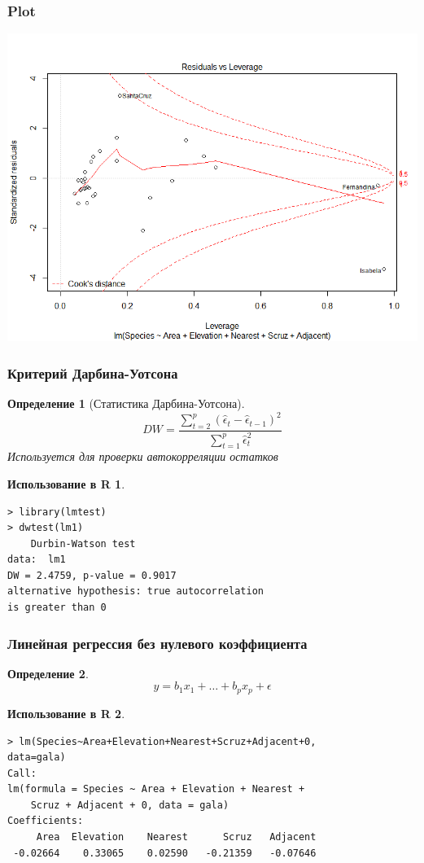 \documentclass{beamer}
\newtheorem{defn}{Определение}
\newtheorem{exmpr}{Использование в R}
\begin{document}
\begin{frame}
\frametitle{Plot}
\begin{center}
\includegraphics[width=1\textwidth,height=0.8\textheight]{lmplot4.png}
\end{center}
\end{frame}

\begin{frame}[containsverbatim]
\frametitle{Критерий Дарбина-Уотсона}
\begin{defn}[Статистика Дарбина-Уотсона]
$$DW=\dfrac{\sum\limits_{t=2}^p(\hat{\epsilon}_t-\hat{\epsilon}_{t-1})^2}{\sum\limits^p_{t=1}\hat{\epsilon}_t^2}$$
Используется для проверки автокорреляции остатков
\end{defn}
\begin{exmpr}
\begin{verbatim}
> library(lmtest)
> dwtest(lm1)
	Durbin-Watson test
data:  lm1 
DW = 2.4759, p-value = 0.9017
alternative hypothesis: true autocorrelation 
is greater than 0 
\end{verbatim}
\end{exmpr}
\end{frame}

\begin{frame}[containsverbatim]
\frametitle{Линейная регрессия без нулевого коэффициента}
\begin{defn}
$$y = b_1x_1+\ldots+b_px_p+\epsilon$$
\end{defn}
\begin{exmpr}
\begin{verbatim}
> lm(Species~Area+Elevation+Nearest+Scruz+Adjacent+0,
data=gala)
Call:
lm(formula = Species ~ Area + Elevation + Nearest + 
    Scruz + Adjacent + 0, data = gala)
Coefficients:
     Area  Elevation    Nearest      Scruz   Adjacent  
 -0.02664    0.33065    0.02590   -0.21359   -0.07646
\end{verbatim}
\end{exmpr}

\end{frame}
\end{document}
